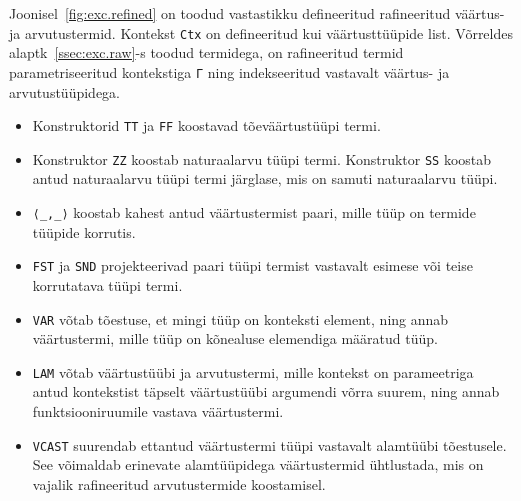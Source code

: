 \documentclass[a4paper,12pt]{article}
\begin{document}
Joonisel~\ref{fig:exc.refined} on toodud vastastikku defineeritud rafineeritud väärtus- ja arvutustermid.
Kontekst {\tt Ctx} on defineeritud kui väärtusttüüpide list.
Võrreldes alaptk~\ref{ssec:exc.raw}-s toodud termidega, on rafineeritud termid parametriseeritud kontekstiga {\tt Γ} ning indekseeritud vastavalt väärtus- ja arvutustüüpidega.
\begin{itemize}
\item Konstruktorid {\tt TT} ja {\tt FF} koostavad tõeväärtustüüpi termi.
\item Konstruktor {\tt ZZ} koostab naturaalarvu tüüpi termi. Konstruktor {\tt SS} koostab antud naturaalarvu tüüpi termi järglase, mis on samuti naturaalarvu tüüpi.
\item {\tt ⟨_,_⟩} koostab kahest antud väärtustermist paari, mille tüüp on termide tüüpide korrutis.
\item {\tt FST} ja {\tt SND} projekteerivad paari tüüpi termist vastavalt esimese või teise korrutatava tüüpi termi.
\item {\tt VAR} võtab tõestuse, et mingi tüüp on konteksti element, ning annab väärtustermi, mille tüüp on kõnealuse elemendiga määratud tüüp.
\item {\tt LAM} võtab väärtustüübi ja arvutustermi, mille kontekst on parameetriga antud kontekstist täpselt väärtustüübi argumendi võrra suurem, ning annab funktsiooniruumile vastava väärtustermi.
\item {\tt VCAST} suurendab ettantud väärtustermi tüüpi vastavalt alamtüübi tõestusele. See võimaldab erinevate alamtüüpidega väärtustermid ühtlustada, mis on vajalik rafineeritud arvutustermide koostamisel.
\end{itemize}
\end{document}
